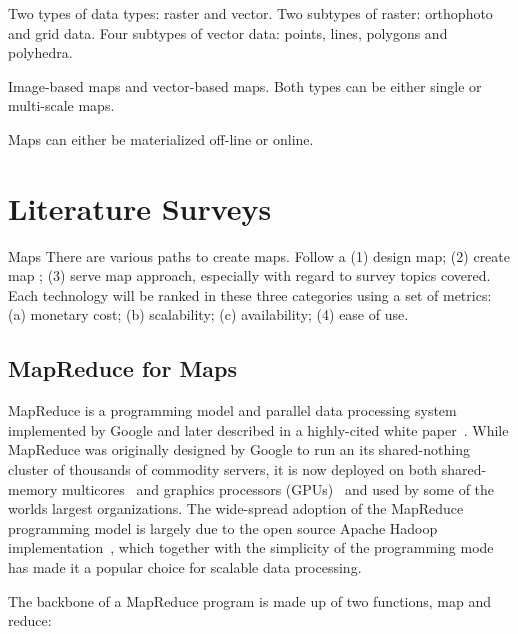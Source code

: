 \documentclass[11pt, oneside]{report}   	%
\begin{document}
Two types of data types: raster and vector. Two subtypes of raster: orthophoto and grid data. Four subtypes of vector data: points, lines, polygons and polyhedra.

Image-based maps and vector-based maps. Both types can be either single or multi-scale maps.

Maps can either be materialized off-line or online.

\chapter{Literature Surveys}

Maps There are various paths to create maps.
Follow a (1) design map; (2) create map ; (3) serve map approach, especially with regard to survey topics covered. Each technology will be ranked in these three categories using a set of metrics: (a) monetary cost; (b) scalability; (c) availability; (4) ease of use.


\section{MapReduce for Maps}


MapReduce is a programming model and parallel data processing system implemented by Google and later described in a highly-cited white paper~\cite{dean2008mapreduce}. While MapReduce was originally designed by Google to run an its shared-nothing cluster of thousands of commodity servers, it is now deployed on both shared-memory multicores~\cite{ranger2007multicore} and graphics processors (GPUs)~\cite{he2008mapreducegpu} and used by some of the worlds largest organizations. The wide-spread adoption of the MapReduce programming model is largely due to the open source Apache Hadoop implementation~\cite{apachehadoop}, which together with the simplicity of the programming mode has made it a popular choice for scalable data processing. 

The backbone of a MapReduce program is made up of two functions, map and reduce:
\end{document}
